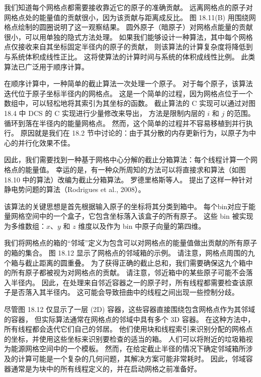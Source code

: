 我们知道每个网格点都需要接收靠近它的原子的准确贡献。 远离网格点的原子对网格点处的能量值的贡献很小，因为该贡献与距离成反比。 
图 18.11(B) 用围绕网格点绘制的圆圈说明了这一观察结果。 
圆外原子（暗原子）对网格点能量的贡献很小，可以用单独的隐式方法处理。 
如果我们能够设计一种算法，其中每个网格点仅接收来自其坐标固定半径内的原子的贡献，
则该算法的计算复杂度将降低到与系统体积成线性正比。 这将使算法的计算时间与系统的体积成线性比例。 此类算法已广泛用于顺序计算。

在顺序计算中，一种简单的截止算法一次处理一个原子。 
对于每个原子，该算法迭代位于原子坐标半径内的网格点。 
这是一个简单的过程，因为网格点位于一个数组中，可以轻松地将其索引为其坐标的函数。 
截止算法的 $\mathrm{C}$ 实现可以通过对图 18.4 中 DCS 的 $\mathrm{C}$ 实现进行少量修改来导出，
方法是限制内层的 $i$ 和 $j$ 的范围。 循环到落在半径内的能量网格点。 然而，这个简单的过程并不容易移植到并行执行。 
原因就是我们在 18.2 节中讨论的：由于其分散的内存更新行为，以原子为中心的并行化效果不佳。

因此，我们需要找到一种基于网格中心分解的截止分箱算法：每个线程计算一个网格点的能量值。 
幸运的是，有一种众所周知的方法可以将直接求和算法（如图 18.10 中的算法）改编为截止分箱算法。 
罗德里格斯等人。 提出了这样一种针对静电势问题的算法（Rodrigues et al., 2008）。

该算法的关键思想是首先根据输入原子的坐标将其分类到箱中。 
每个bin对应于能量网格空间中的一个盒子，它包含坐标落入该盒子的所有原子。 
这些 bin 被实现为多维数组：$x、y$ 和 $z$ 维度以及作为 bin 中原子向量的第四维。

我们将网格点的箱的“邻域”定义为包含可以对网格点的能量值做出贡献的所有原子的箱的集合。 
图 18.12 显示了网格点的邻域箱的示例。 请注意，网格点周围的九个箱与截止距离的圆重叠。 
为了获得正确的截止总和，我们需要确保这九个箱中的所有原子都被视为对网格点的贡献。 
请注意，邻近箱中的某些原子可能不会落入半径内。 
因此，在处理来自邻近容器之一的原子时，所有线程都需要检查该原子是否落入其半径内。 
这可能会导致扭曲中的线程之间出现一些控制分歧。

尽管图 18.12 仅显示了一层 (2D) 容器，这些容器直接围绕包含网格点作为其邻域的容器，
但实际算法通常在网格点的邻域中具有多个 3D 容器。 在这种方法中，所有线程都会迭代它们自己的邻居。 
他们使用块和线程索引来识别分配的网格点的坐标，并使用这些坐标来识别要检查的适当的箱。 
人们可以将附近的垃圾箱视为能源网格空间中的一个模板。 
然而，在给定截止半径的情况下确定邻域箱所涉及的计算可能是一个复杂的几何问题，其解决方案可能非常耗时。 
因此，邻域容器通常是为块中的所有线程定义的，并在启动网格之前准备好。

